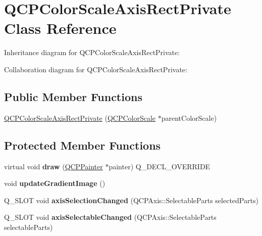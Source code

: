 \hypertarget{classQCPColorScaleAxisRectPrivate}{}\section{Q\+C\+P\+Color\+Scale\+Axis\+Rect\+Private Class Reference}
\label{classQCPColorScaleAxisRectPrivate}


Inheritance diagram for Q\+C\+P\+Color\+Scale\+Axis\+Rect\+Private\+:


Collaboration diagram for Q\+C\+P\+Color\+Scale\+Axis\+Rect\+Private\+:
\subsection*{Public Member Functions}
\begin{DoxyCompactItemize}
\item 
\hyperlink{classQCPColorScaleAxisRectPrivate_ad3b242f75dd2b33581364a4e668a80db}{Q\+C\+P\+Color\+Scale\+Axis\+Rect\+Private} (\hyperlink{classQCPColorScale}{Q\+C\+P\+Color\+Scale} $\ast$parent\+Color\+Scale)
\end{DoxyCompactItemize}
\subsection*{Protected Member Functions}
\begin{DoxyCompactItemize}
\item 
virtual void {\bfseries draw} (\hyperlink{classQCPPainter}{Q\+C\+P\+Painter} $\ast$painter) Q\+\_\+\+D\+E\+C\+L\+\_\+\+O\+V\+E\+R\+R\+I\+DE\hypertarget{classQCPColorScaleAxisRectPrivate_a52a21c7cbe086cd587c955cfe6e25e3b}{}\label{classQCPColorScaleAxisRectPrivate_a52a21c7cbe086cd587c955cfe6e25e3b}

\item 
void {\bfseries update\+Gradient\+Image} ()\hypertarget{classQCPColorScaleAxisRectPrivate_a73754cab312aeaddea1bfcc67cc079ac}{}\label{classQCPColorScaleAxisRectPrivate_a73754cab312aeaddea1bfcc67cc079ac}

\item 
Q\+\_\+\+S\+L\+OT void {\bfseries axis\+Selection\+Changed} (Q\+C\+P\+Axis\+::\+Selectable\+Parts selected\+Parts)\hypertarget{classQCPColorScaleAxisRectPrivate_a6112ad4291ac1695d37659cb049d598d}{}\label{classQCPColorScaleAxisRectPrivate_a6112ad4291ac1695d37659cb049d598d}

\item 
Q\+\_\+\+S\+L\+OT void {\bfseries axis\+Selectable\+Changed} (Q\+C\+P\+Axis\+::\+Selectable\+Parts selectable\+Parts)\hypertarget{classQCPColorScaleAxisRectPrivate_a66d2baed86966bb03a6d7c32dc7d59f7}{}\label{classQCPColorScaleAxisRectPrivate_a66d2baed86966bb03a6d7c32dc7d59f7}

\end{DoxyCompactItemize}
